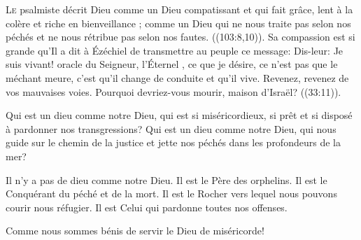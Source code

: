 \dvrule







\lettrine{L}{e} psalmiste décrit Dieu comme un Dieu \Og compatissant
 et qui fait grâce, lent à la colère et riche en bienveillance \Fg{};
 comme un Dieu \Og qui ne nous traite pas selon nos péchés et ne nous rétribue pas
 selon nos fautes.\Fg{} ((103:8,10)).
 Sa compassion est si grande qu'Il a dit à Ézéchiel de transmettre au peuple
 ce message: Dis-leur:  \Og Je suis vivant!
 \ocadr oracle du Seigneur, l'Éternel \fcadr{}, ce que je désire,
 ce n'est pas que le méchant meure, c'est qu'il change de conduite
 et qu'il vive. Revenez, revenez de vos mauvaises voies.
 Pourquoi devriez-vous mourir, maison d'Israël?\Fg{} ((33:11)). 


Qui est un dieu comme notre Dieu, qui est si miséricordieux,
 si prêt et si disposé à pardonner nos transgressions?
 Qui est un dieu comme notre Dieu, qui nous guide sur le chemin
 de la justice et jette nos péchés dans les profondeurs de la mer? 

Il n'y a pas de dieu comme notre Dieu. Il est le Père des orphelins.
 Il est le Conquérant du péché et de la mort. Il est le Rocher
 vers lequel nous pouvons courir nous réfugier.
 Il est Celui qui pardonne toutes nos offenses. 

Comme nous sommes bénis de servir le Dieu de miséricorde! 

\dvrule



